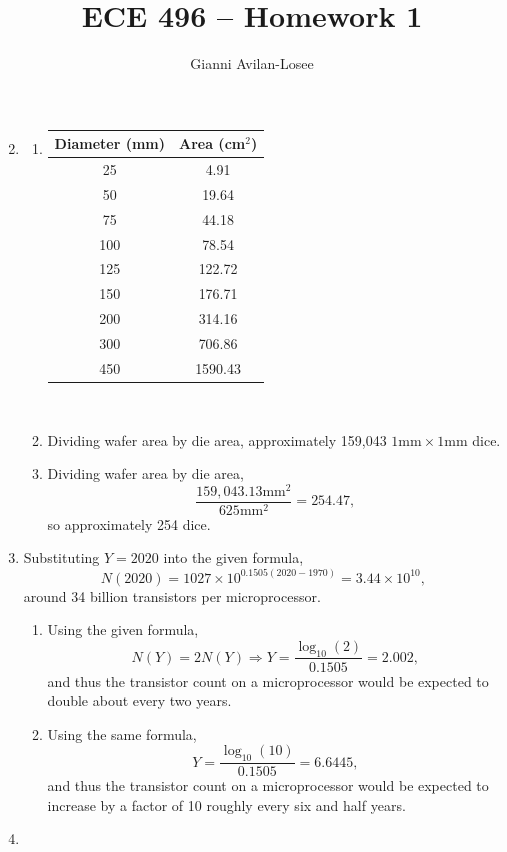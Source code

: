 \documentclass{article}
\title{ECE 496 -- Homework 1}
\author{Gianni Avilan-Losee}
\begin{document}
\begin{enumerate}
	\setcounter{enumi}{1}
	\item
	\begin{enumerate}[label=\alph*)]
		\item 
			\begin{tabular}{|c|c|}
				\hline
				Diameter (mm) & Area (cm\(^2\)) \\
				\hline
				25 & 4.91 \\
				\hline 
				50 & 19.64\\
				\hline
				75 & 44.18\\
				\hline
				100 & 78.54 \\
				\hline
				125  & 122.72\\
				\hline
				150 & 176.71\\
				\hline
				200 & 314.16\\
				\hline
				300 & 706.86\\
				\hline
				450 & 1590.43\\
				\hline
			\end{tabular} 
     \\
	 \item Dividing wafer area by die area, approximately 159,043 \(1\text{mm} \times 1\text{mm}\) dice.
		 \\
	 \item Dividing wafer area by die area, \[
			 \frac{159,043.13\text{mm}^2}{625\text{mm}^2} = 254.47,
	 \] 
	 so approximately 254 dice.
	\end{enumerate}
	\setcounter{enumi}{4}
\item Substituting \(Y = 2020\) into the given formula, \[
		N(2020) = 1027 \times 10^{0.1505(2020-1970)} = 3.44 \times 10^{10},
\]
around 34 billion transistors per microprocessor.
\setcounter{enumi}{6}
		\begin{enumerate}[label=\alph*)]
\item Using the given formula, \[
		N(Y) = 2N(Y) \Rightarrow Y = \frac{\log_{10}(2)}{0.1505} = 2.002, 
\] 
and thus the transistor count on a microprocessor would be expected to double about every two years. 
\item Using the same formula, \[
		Y = \frac{\log_{10}(10)}{0.1505} = 6.6445,
\] and thus the transistor count on a microprocessor would be expected to increase by a factor of 10 roughly every six and half years.
\end{enumerate}
\setcounter{enumi}{11}
\item
\begin{enumerate}[label=\alph*)]

\end{enumerate}
\end{enumerate}
\end{document}
